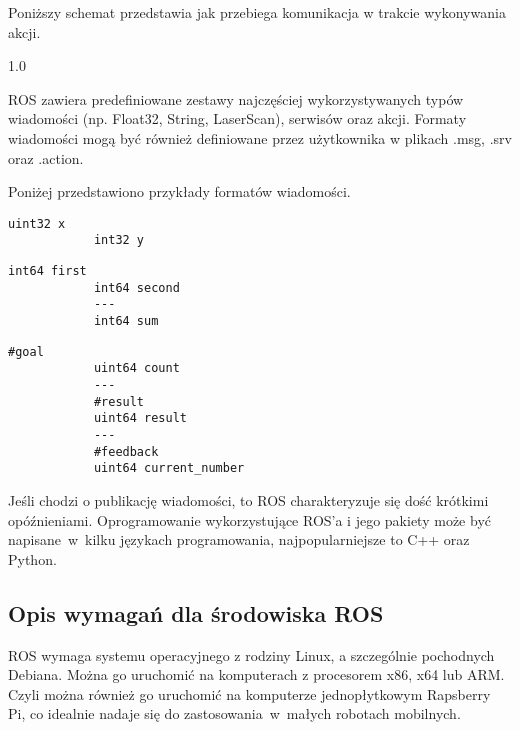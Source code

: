 {{        Poniższy schemat przedstawia jak przebiega komunikacja w trakcie wykonywania akcji.
        
         {1.0}{\cite{ros_actionlib}}
        
        ROS zawiera predefiniowane zestawy najczęściej wykorzystywanych typów \cite{types}  wiadomości (np. Float32, String, LaserScan), serwisów oraz akcji. Formaty wiadomości mogą być również definiowane przez użytkownika w plikach .msg, .srv oraz .action.
        
        \newpage
        Poniżej przedstawiono przykłady formatów wiadomości.
        
        \begin{lstlisting}[caption=Przykładowy plik wiadomości tematu .msg]
            uint32 x
            int32 y
        \end{lstlisting}
        
        \begin{lstlisting}[caption=Przykładowy plik wiadomości serwisu .srv]
            int64 first
            int64 second
            ---
            int64 sum
        \end{lstlisting}
        
        \begin{lstlisting}[caption=Przykładowy plik akcji .action]
            #goal
            uint64 count
            ---
            #result
            uint64 result
            ---
            #feedback
            uint64 current_number
        \end{lstlisting}
        
        Jeśli chodzi o publikację wiadomości, to ROS charakteryzuje się dość krótkimi opóźnieniami. Oprogramowanie wykorzystujące ROS'a i jego pakiety może być napisane~w~kilku językach programowania, najpopularniejsze to C++ oraz Python.
    }
    \subsection{Opis wymagań dla środowiska ROS}
    {
        ROS wymaga systemu operacyjnego z rodziny Linux, a szczególnie pochodnych Debiana. Można go uruchomić na komputerach z procesorem x86, x64 lub ARM. Czyli można również go uruchomić na komputerze jednopłytkowym Rapsberry Pi, co idealnie nadaje się do zastosowania~w~małych robotach mobilnych.
    }
        
}
